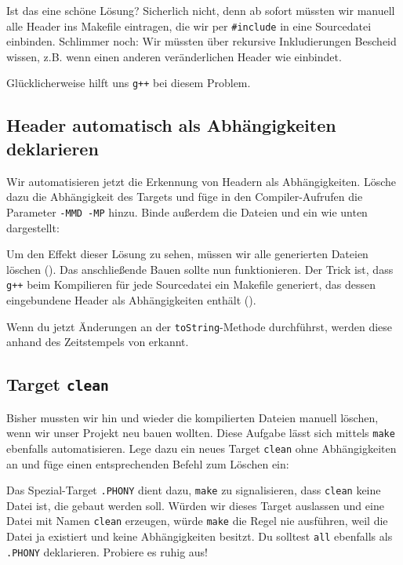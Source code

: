 Ist das eine schöne Lösung?
Sicherlich nicht, denn ab sofort müssten wir manuell alle Header ins Makefile eintragen, die wir per \lstinline{#include} in eine Sourcedatei einbinden.
Schlimmer noch: Wir müssten über rekursive Inkludierungen Bescheid wissen, z.B. wenn  einen anderen veränderlichen Header wie  einbindet.

Glücklicherweise hilft uns \texttt{g++} bei diesem Problem.

\subsection{Header automatisch als Abhängigkeiten deklarieren}

Wir automatisieren jetzt die Erkennung von Headern als Abhängigkeiten.
Lösche dazu die Abhängigkeit  des Targets  und füge in den Compiler-Aufrufen die Parameter \texttt{-MMD -MP} hinzu.
Binde außerdem die Dateien  und  ein wie unten dargestellt:


Um den Effekt dieser Lösung zu sehen, müssen wir alle generierten Dateien löschen ().
Das anschließende Bauen sollte nun funktionieren.
Der Trick ist, dass \texttt{g++} beim Kompilieren für jede Sourcedatei ein Makefile generiert, das dessen eingebundene Header als Abhängigkeiten enthält ().

Wenn du jetzt Änderungen an der \lstinline{toString}-Methode durchführst, werden diese anhand des Zeitstempels von  erkannt.

\subsection{Target \lstinline{clean}}

Bisher mussten wir hin und wieder die kompilierten Dateien manuell löschen, wenn wir unser Projekt neu bauen wollten.
Diese Aufgabe lässt sich mittels \texttt{make} ebenfalls automatisieren. Lege dazu ein neues Target \texttt{clean} ohne Abhängigkeiten an und füge einen entsprechenden Befehl zum Löschen ein:

Das Spezial-Target \texttt{.PHONY} dient dazu, \texttt{make} zu signalisieren, dass \texttt{clean} keine Datei ist, die gebaut werden soll.
Würden wir dieses Target auslassen und eine Datei mit Namen \texttt{clean} erzeugen, würde \texttt{make} die Regel nie ausführen, weil die Datei ja existiert und keine Abhängigkeiten besitzt.
Du solltest \texttt{all} ebenfalls als \texttt{.PHONY} deklarieren.
Probiere es ruhig aus!

